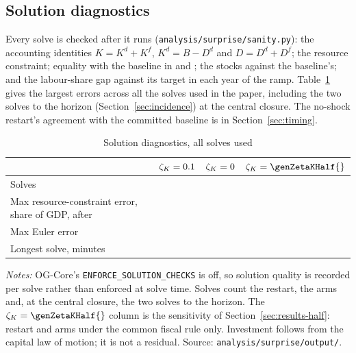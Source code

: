 \subsection{Solution diagnostics}
\label{app:diagnostics}

Every solve is checked after it runs (\texttt{analysis/surprise/sanity.py}): the accounting identities $K = K^d + K^f$, $K^d = B - D^d$ and $D = D^d + D^f$; the resource constraint; equality with the baseline in \genStartYear{} and \genRampZeroYear{}; the \genShockYear{} stocks against the baseline's; and the labour-share gap against its target in each year of the ramp. Table~\ref{tab:diagnostics} gives the largest errors across all the solves used in the paper, including the two solves to the horizon (Section~\ref{sec:incidence}) at the central closure. The no-shock restart's agreement with the committed baseline is in Section~\ref{sec:timing}.

\begin{table}[htbp]
\centering
\caption{Solution diagnostics, all solves used}
\label{tab:diagnostics}
\small
\begin{tabular}{lrrr}
\toprule
 & $\zeta_K = 0.1{}$ & $\zeta_K = 0{}$ & $\zetaK = \genZetaKHalf{}$ \\
\midrule
Solves & \genNSolvesCentral{} & \genNSolvesBound{} & \genNSolvesHalf{} \\
Max resource-constraint error, share of GDP, after \genShockYear{} & \genRcMaxCentral{} & \genRcMaxBound{} & \genRcMaxHalf{} \\
Max Euler error & \genEulerMaxCentral{} & \genEulerMaxBound{} & \genEulerMaxHalf{} \\
Longest solve, minutes & \genSolveMinMaxCentral{} & \genSolveMinMaxBound{} & \genSolveMinMaxHalf{} \\
\bottomrule
\end{tabular}
\par\medskip
\begin{minipage}{0.92\textwidth}
\footnotesize \emph{Notes:} OG-Core's \texttt{ENFORCE\_SOLUTION\_CHECKS} is off, so solution quality is recorded per solve rather than enforced at solve time. Solves count the restart, the arms and, at the central closure, the two solves to the horizon. The $\zetaK = \genZetaKHalf{}$ column is the sensitivity of Section~\ref{sec:results-half}: restart and arms under the common fiscal rule only. Investment follows from the capital law of motion; it is not a residual. Source: \texttt{analysis/surprise/output/}.
\end{minipage}
\end{table}


